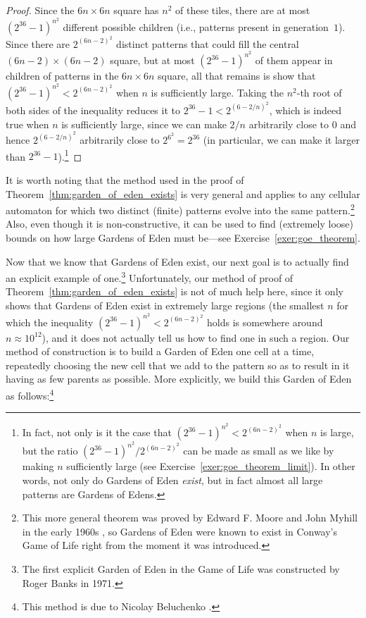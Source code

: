 \begin{proof}
	Since the $6n \times 6n$ square has $n^2$ of these tiles, there are at most $(2^{36}-1)^{n^2}$ different possible children (i.e., patterns present in generation~$1$). Since there are $2^{(6n-2)^2}$ distinct patterns that could fill the central $(6n-2) \times (6n-2)$ square, but at most $(2^{36}-1)^{n^2}$ of them appear in children of patterns in the $6n \times 6n$ square, all that remains is show that $(2^{36}-1)^{n^2} < 2^{(6n-2)^2}$ when $n$ is sufficiently large. Taking the $n^2$-th root of both sides of the inequality reduces it to $2^{36} - 1 < 2^{(6 - 2/n)^2}$, which is indeed true when $n$ is sufficiently large, since we can make $2/n$ arbitrarily close to $0$ and hence $2^{(6 - 2/n)^2}$ arbitrarily close to $2^{6^2} = 2^{36}$ (in particular, we can make it larger than $2^{36} - 1$).\footnote{In fact, not only is it the case that $(2^{36}-1)^{n^2} < 2^{(6n-2)^2}$ when $n$ is large, but the ratio $(2^{36}-1)^{n^2} / 2^{(6n-2)^2}$ can be made as small as we like by making $n$ sufficiently large (see Exercise~\ref{exer:goe_theorem_limit}). In other words, not only do Gardens of Eden \emph{exist}, but in fact almost all large patterns are Gardens of Edens.}
\end{proof}

It is worth noting that the method used in the proof of Theorem~\ref{thm:garden_of_eden_exists} is very general and applies to any cellular automaton for which two distinct (finite) patterns evolve into the same pattern.\footnote{This more general theorem was proved by Edward F. Moore and John Myhill in the early 1960s \cite{Moo62,Myh63}, so Gardens of Eden were known to exist in Conway's Game of Life right from the moment it was introduced.} Also, even though it is non-constructive, it can be used to find (extremely loose) bounds on how large Gardens of Eden must be---see Exercise~\ref{exer:goe_theorem}.

Now that we know that Gardens of Eden exist, our next goal is to actually find an explicit example of one.\footnote{The first explicit Garden of Eden in the Game of Life was constructed by Roger Banks in 1971.} Unfortunately, our method of proof of Theorem~\ref{thm:garden_of_eden_exists} is not of much help here, since it only shows that Gardens of Eden exist in extremely large regions (the smallest $n$ for which the inequality $(2^{36}-1)^{n^2} < 2^{(6n-2)^2}$ holds is somewhere around $n \approx 10^{12}$), and it does not actually tell us how to find one in such a region. Our method of construction is to build a Garden of Eden one cell at a time, repeatedly choosing the new cell that we add to the pattern so as to result in it having as few parents as possible. More explicitly, we build this Garden of Eden as follows:\footnote{This method is due to Nicolay Beluchenko \cite{A196447}.}\medskip

